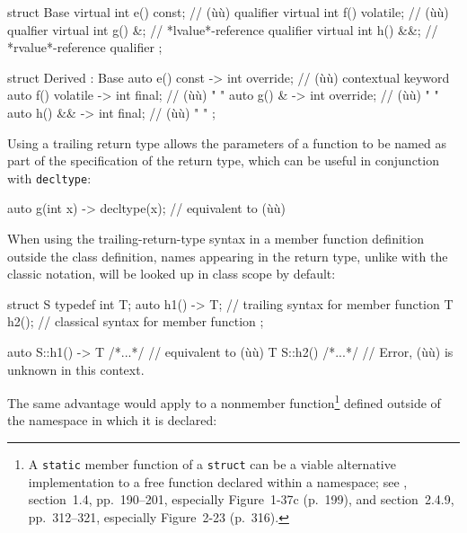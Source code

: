 \begin{emcppslisting}
struct Base
{
    virtual int e() const;     // (ù{}ù) qualifier
    virtual int f() volatile;  // (ù{}ù) qualfier
    virtual int g() &;         // *lvalue*-reference qualifier
    virtual int h() &&;        // *rvalue*-reference qualifier
};

struct Derived : Base
{
    auto e() const    -> int override;  //  (ù{}ù) contextual keyword
    auto f() volatile -> int final;     //  (ù{}ù)         "        "
    auto g() &        -> int override;  //  (ù{}ù)      "        "
    auto h() &&       -> int final;     //  (ù{}ù)         "        "
};
\end{emcppslisting}

\noindent Using a trailing return type allows the parameters of a function to be
named as part of the specification of the return type, which can be
useful in conjunction with \lstinline!decltype!:

\begin{emcppslisting}
auto g(int x) -> decltype(x);  // equivalent to (ù{}ù)
\end{emcppslisting}

\noindent When using the trailing-return-type syntax in a member function
definition outside the class definition, names appearing in the return
type, unlike with the classic notation, will be looked up in class scope
by default:

\begin{emcppslisting}
struct S
{
    typedef int T;
    auto h1() -> T;  // trailing syntax for member function
    T h2();          // classical syntax for member function
};

auto S::h1() -> T { /*...*/ }  // equivalent to (ù{}ù)
T    S::h2()      { /*...*/ }  // Error, (ù{}ù) is unknown in this context.
\end{emcppslisting}

\noindent The same advantage would apply to a nonmember
function{\cprotect\footnote{A \lstinline!static! member function of a
\lstinline!struct! can be a viable alternative implementation to a free
function declared within a namespace; see \cite{lakos20}, section~1.4,
pp.~190--201, especially Figure~1-37c (p.~199), and section~2.4.9, pp.~312--321, especially Figure~2-23 (p.~316).}} defined outside of the namespace in
which it is declared:

